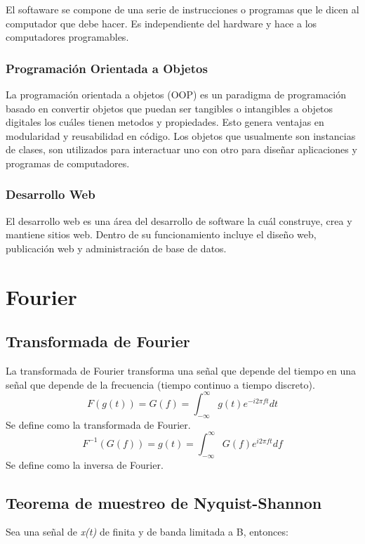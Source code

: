 El softaware se compone de una serie de instrucciones o programas que le dicen al computador que debe hacer. Es independiente del hardware y hace a los computadores programables.  \cite{A31}

\subsubsection{Programación Orientada a Objetos}

La programación orientada a objetos (OOP) es un paradigma de programación  basado en convertir objetos que puedan ser tangibles o intangibles a objetos digitales los cuáles tienen metodos y propiedades. Esto genera ventajas en modularidad y reusabilidad en código. Los objetos que usualmente son instancias de clases, son utilizados para interactuar uno con otro para diseñar aplicaciones y programas de computadores. \cite{A32}

\subsubsection{Desarrollo Web}

El desarrollo web es una área del desarrollo de software la cuál construye, crea y mantiene sitios web. Dentro de su funcionamiento incluye el diseño web, publicación web y administración de base de datos. \cite{A33}

\section{Fourier}
\subsection{Transformada de Fourier}
La transformada de Fourier transforma una señal que depende del tiempo en una señal que depende de la frecuencia (tiempo continuo a tiempo discreto).
\begin{equation}
F(g(t))=G(f)=\int_{-\infty}^{\infty}g(t)e^{-i2\pi ft}dt   
\end{equation}
Se define como la transformada de Fourier. \cite{A34}
\begin{equation}
F^{-1}(G(f))=g(t)=\int_{-\infty}^{\infty}G(f)e^{i2\pi ft}df   
\end{equation} 
Se define como  la inversa de Fourier. \cite{A34}

\subsection{Teorema de muestreo de Nyquist-Shannon}
Sea una señal de \textit{x(t)} de  finita y de banda  limitada  a B, entonces:
\\

